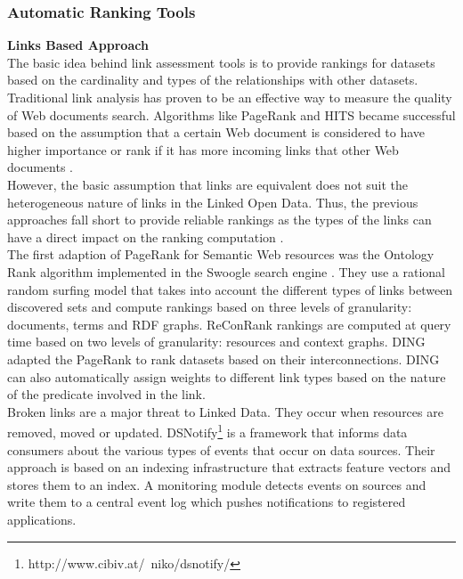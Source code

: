 \documentclass[onecolumn, crcready]{iosart2c}
\begin{document}
\subsubsection {Automatic Ranking Tools}

{\bf Links Based Approach}\\

The basic idea behind link assessment tools is to provide rankings for datasets based on the cardinality and types of the relationships with other datasets. Traditional link analysis has proven to be an effective way to measure the quality of Web documents search. Algorithms like PageRank \cite{Lawrence981} and HITS \cite{Kleinberg:1999} became successful based on the assumption that a certain Web document is considered to have higher importance or rank if it has more incoming links that other Web documents \cite{Brin:1998}\cite{Chakrabarti99miningthe}.\\ However, the basic assumption that links are equivalent does not suit the heterogeneous nature of links in the Linked Open Data. Thus, the previous approaches fall short to provide reliable rankings as the types of the links can have a direct impact on the ranking computation \cite{Toupikov2009}.\\ The first adaption of PageRank for Semantic Web resources was the Ontology Rank algorithm implemented in the Swoogle search engine \cite{Ding2004}. They use a rational random surfing model that takes into account the different types of links between discovered sets and compute rankings based on three levels of granularity: documents, terms and RDF graphs. ReConRank \cite{Hogan06reconrank:a} rankings are computed at query time based on two levels of granularity: resources and context graphs. DING \cite{Toupikov2009} adapted the PageRank to rank datasets based on their interconnections. DING can also automatically assign weights to different link types based on the nature of the predicate involved in the link.\\Broken links are a major threat to Linked Data. They occur when resources are removed, moved or updated. DSNotify\footnote{http://www.cibiv.at/~niko/dsnotify/}\cite{cs142} is a framework that informs data consumers about the various types of events that occur on data sources. Their approach is based on an indexing infrastructure that extracts feature vectors and stores them to an index. A monitoring module detects events on sources and write them to a central event log which pushes notifications to registered applications.\\
\end{document}

